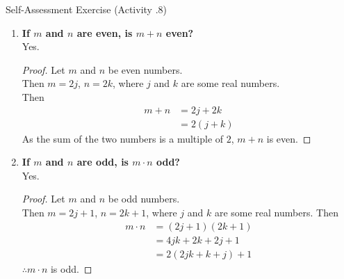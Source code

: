 \documentclass[../notes.tex]{subfiles}
\begin{document}
\begin{exercise}{Self-Assessment Exercise (Activity \thechapter.8)}
\begin{enumerate}
\begin{proof}
					\end{proof}
					\item \textbf{If $m$ and $n$ are even, is $m + n$ even?}\\
					Yes. \rule{0pt}{11pt} \vspace*{-18pt}
					\begin{proof}
						Let $m$ and $n$ be even numbers.\\
						Then $m = 2j$, $n = 2k$, where $j$ and $k$ are some real numbers.\\
						Then
						\begin{align*}
							m + n &= 2j + 2k\\
							&= 2(j + k)
						\end{align*}
						As the sum of the two numbers is a multiple of $2$, $m + n$ is even.
					\end{proof}
					\item \textbf{If $m$ and $n$ are odd, is $m \cdot n$ odd?}\\
					Yes. \rule{0pt}{11pt} \vspace*{-18pt}
					\begin{proof}
						Let $m$ and $n$ be odd numbers.\\
						Then $m = 2j + 1$, $n = 2k + 1$, where $j$ and $k$ are some real numbers.
						Then
						\begin{align*}
							m\cdot n &= (2j + 1)(2k + 1)\\
							&= 4jk + 2k + 2j + 1\\
							&= 2(2jk + k + j) + 1
						\end{align*}
						$\therefore m \cdot n$ is odd. 
					\end{proof}
				\end{enumerate}
			\end{exercise}
\end{document}
